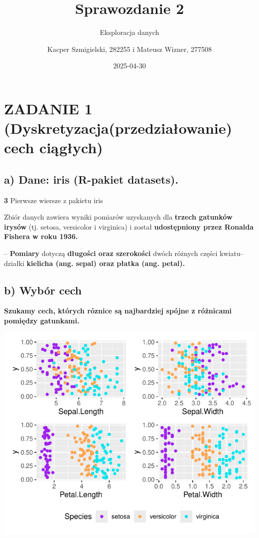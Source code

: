 \documentclass[
  12pt,
]{article}
\title{Sprawozdanie 2}
\subtitle{Eksploracja danych}
\author{Kacper Szmigielski, 282255 i Mateusz Wizner, 277508}
\date{2025-04-30}
\begin{document}
\maketitle

{
\setcounter{tocdepth}{3}
\tableofcontents
}
\section{ZADANIE 1 (Dyskretyzacja(przedziałowanie) cech
ciągłych)}\label{zadanie-1-dyskretyzacjaprzedziaux142owanie-cech-ciux105gux142ych}

\subsection{a) Dane: iris (R-pakiet
datasets).}\label{a-dane-iris-r-pakiet-datasets.}

\textbf{3} Pierwsze wiersze z pakietu iris

Zbiór danych zawiera wyniki pomiarów uzyskanych dla \textbf{trzech
gatunków irysów} (tj. setosa, versicolor i virginica) i został
\textbf{udostępniony przez Ronalda Fishera w roku 1936.}

-- \textbf{Pomiary} dotyczą \textbf{długości oraz szerokości} dwóch
różnych części kwiatu-- działki \textbf{kielicha (ang. sepal) oraz
płatka (ang. petal).}

\subsection{b) Wybór cech}\label{b-wybuxf3r-cech}

\textbf{Szukamy cech, których róznice są najbardziej spójne z różnicami
pomiędzy gatunkami.}

\begin{center}\includegraphics{Sprawozdanie2_files/figure-latex/zad1b1-1} \end{center}
\end{document}
